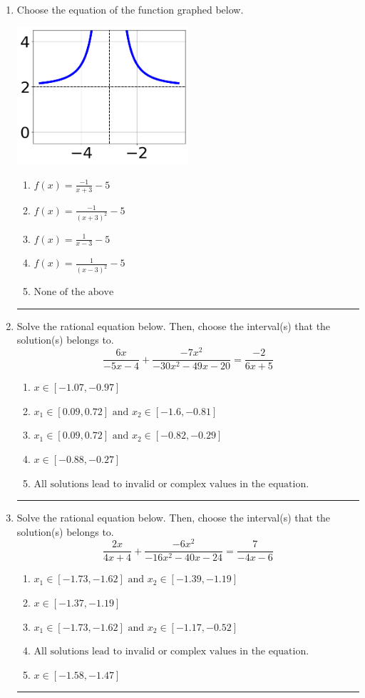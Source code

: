 \documentclass[14pt]{extbook}
\newcommand{\litem}[1]{\item#1\hspace*{-1cm}\rule{\textwidth}{0.4pt}}
\begin{document}
\begin{enumerate}
{\begin{enumerate}[label=\Alph*.]
\end{enumerate} }
\litem{
Choose the equation of the function graphed below.
\begin{center}
    \includegraphics[width=0.5\textwidth]{../Figures/rationalGraphToEquationCopyB.png}
\end{center}
\begin{enumerate}[label=\Alph*.]
\item \( f(x) = \frac{-1}{x + 3} - 5 \)
\item \( f(x) = \frac{-1}{(x + 3)^2} - 5 \)
\item \( f(x) = \frac{1}{x - 3} - 5 \)
\item \( f(x) = \frac{1}{(x - 3)^2} - 5 \)
\item \( \text{None of the above} \)

\end{enumerate} }
\litem{
Solve the rational equation below. Then, choose the interval(s) that the solution(s) belongs to.\[ \frac{6x}{-5x -4} + \frac{-7x^{2}}{-30x^{2} -49 x -20} = \frac{-2}{6x + 5} \]\begin{enumerate}[label=\Alph*.]
\item \( x \in [-1.07,-0.97] \)
\item \( x_1 \in [0.09, 0.72] \text{ and } x_2 \in [-1.6,-0.81] \)
\item \( x_1 \in [0.09, 0.72] \text{ and } x_2 \in [-0.82,-0.29] \)
\item \( x \in [-0.88,-0.27] \)
\item \( \text{All solutions lead to invalid or complex values in the equation.} \)

\end{enumerate} }
\litem{
Solve the rational equation below. Then, choose the interval(s) that the solution(s) belongs to.\[ \frac{2x}{4x + 4} + \frac{-6x^{2}}{-16x^{2} -40 x -24} = \frac{7}{-4x -6} \]\begin{enumerate}[label=\Alph*.]
\item \( x_1 \in [-1.73, -1.62] \text{ and } x_2 \in [-1.39,-1.19] \)
\item \( x \in [-1.37,-1.19] \)
\item \( x_1 \in [-1.73, -1.62] \text{ and } x_2 \in [-1.17,-0.52] \)
\item \( \text{All solutions lead to invalid or complex values in the equation.} \)
\item \( x \in [-1.58,-1.47] \)


\end{enumerate}}
\end{enumerate}
\end{document}

